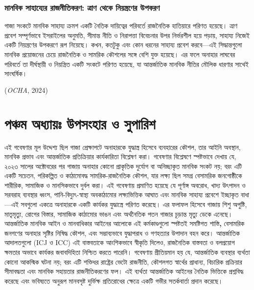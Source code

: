 \subsubsection{মানবিক সাহায্যের রাজনীতিকরণ: ত্রাণ থেকে নিয়ন্ত্রণের
উপকরণ}\label{ux9aeux9a8ux9acux995-ux9b8ux9b9ux9afux9afux9b0-ux9b0ux99cux9a8ux9a4ux995ux9b0ux9a3-ux9a4ux9b0ux9a3-ux9a5ux995-ux9a8ux9afux9a8ux9a4ux9b0ux9a3ux9b0-ux989ux9aaux995ux9b0ux9a3}

গাজা সংকটে মানবিক সাহায্য ক্রমশ একটি নৈতিক দায়িত্বের পরিবর্তে রাজনৈতিক
হাতিয়ারে পরিণত হয়েছে। ত্রাণ প্রবেশ সম্পূর্ণভাবে ইসরাইলের অনুমতি, সীমান্ত নীতি ও
নিরাপত্তা বিবেচনার উপর নির্ভরশীল হয়ে পড়ায়, সাহায্য নিজেই একটি নিয়ন্ত্রণের
উপকরণে রূপ নিয়েছে। কখন, কতটুকু এবং কোন ধরনের সাহায্য প্রবেশ করবে---এই
সিদ্ধান্তগুলো মানবিক প্রয়োজনের চেয়ে রাজনৈতিক ও সামরিক কৌশলের সঙ্গে বেশি যুক্ত
হয়েছে। এর ফলে অনাহার লাঘবের পরিবর্তে তা দীর্ঘস্থায়ী ও নিয়ন্ত্রিত একটি সংকটে
পরিণত হয়েছে, যা আন্তর্জাতিক মানবিক নীতির মৌলিক ধারণার সাথেই সাংঘর্ষিক।

(\emph{OCHA}, 2024)

\vspace{0.3em}

\section{পঞ্চম অধ্যায়ঃ উপসংহার ও সুপারিশ}\label{ux9b7ux9b7ux9a0-ux985ux9a7ux9afux9df-ux989ux9aaux9b8ux9b9ux9b0-ux993-ux9b8ux9aaux9b0ux9b6}


এই গবেষণার মূল উদ্দেশ্য ছিল গাজা প্রেক্ষাপটে অনাহারকে যুদ্ধাস্ত্র হিসেবে ব্যবহারের
কৌশল, তার আইনি অবস্থান, মানবিক প্রভাব এবং আন্তর্জাতিক প্রতিক্রিয়ার কার্যকারিতা
বিশ্লেষণ করা। গবেষণার বিশ্লেষণে স্পষ্টভাবে দেখায় যে, ২০২৩ সালের অক্টোবরের পর
গাজায় অনাহার কোনো প্রাকৃতিক দুর্যোগ বা অনিচ্ছাকৃত মানবিক সংকট নয়; বরং এটি একটি
সচেতন, পরিকল্পিত ও কাঠামোবদ্ধ সামরিক-রাজনৈতিক কৌশল, যার লক্ষ্য ছিল সমগ্র
বেসামরিক জনগোষ্ঠীকে শারীরিক, সামাজিক ও মানসিকভাবে দুর্বল করা। এই গবেষণায়
প্রমাণিত হয়েছে যে পূর্ণাঙ্গ অবরোধ, খাদ্য উৎপাদন ও সরবরাহ ব্যবস্থার ধ্বংস,
পানি-বিদ্যুৎ-স্বাস্থ্য অবকাঠামোর লক্ষ্যভিত্তিক আঘাত এবং মানবিক সাহায্য প্রবেশে
ইচ্ছাকৃত বাধা---এই সবগুলো একত্রে অনাহারকে একটি কার্যকর যুদ্ধাস্ত্রে পরিণত করেছে।
এর ফলাফল হিসেবে গাজায় শিশু অপুষ্টি, মাতৃমৃত্যু, রোগের বিস্তার, সামাজিক কাঠামোর
ভাঙন এবং অর্থনৈতিক পতন গাজার চূড়ান্ত মৃত্যু ডেকে এনেছে। আন্তর্জাতিক মানবিক আইন ও
মানবাধিকার আইনের আলোকে এই কর্মকাণ্ডগুলো স্পষ্টতই সমষ্টিগত শাস্তি\textbf{,}
বেসামরিক জনগণের অনাহার সৃষ্টির নিষিদ্ধ কৌশল, এবং সম্ভাব্যভাবে যুদ্ধাপরাধ ও
গণহত্যার উপাদান বহন করে। আন্তর্জাতিক আদালতগুলো (ICJ ও ICC) এই বাস্তবতাকে
আংশিকভাবে স্বীকৃতি দিলেও, রাজনৈতিক বাস্তবতা ও বলপ্রয়োগ ক্ষমতার অভাবে কার্যকর
জবাবদিহিতা নিশ্চিত করতে পারেনি। গবেষণায় প্রীতিয়মান হয় যে, আন্তর্জাতিক
ব্যবস্থার ব্যর্থতা কোনো আকস্মিক ঘটনা নয়; বরং এটি শক্তিধর রাষ্ট্রের ভেটো রাজনীতি,
কৌশলগত স্বার্থের প্রাধান্য, বিচারিক প্রক্রিয়ার সীমাবদ্ধতা এবং মানবিক সহায়তার
রাজনীতিকরণের ফল। এই ব্যর্থতা আন্তর্জাতিক আইনের নৈতিক ভিত্তিকে প্রশ্নবিদ্ধ করেছে
এবং ভবিষ্যতে অনুরূপ মানবসৃষ্ট দুর্ভিক্ষ প্রতিরোধের ক্ষেত্রে একটি গভীর সতর্কবার্তা
প্রদান করেছে।

